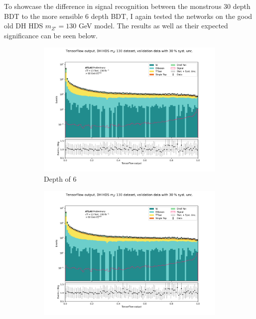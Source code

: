\documentclass[14pt, a4paper]{book}
\begin{document}
\clearpage\noindent To showcase the difference in signal recognition between the monstrous 30 depth BDT to the more sensible 6 depth BDT, I again tested the networks on the good old DH HDS $m_{Z'}=130$ GeV model.
The results as well as their expected significance can be seen below.
\begin{figure}[!ht]
	\centering
   \graphicspath{{../../../Plots/XGBoost/FULL/GRIDSEARCH_n_est_10-1000/DH_HDS_mZp_130/}}
	\begin{subfigure}[b]{0.49\textwidth}
        \centering
        \includegraphics[width=1\textwidth]{VAL.pdf}
        \caption{Depth of 6}
     \end{subfigure}
     \hfill\graphicspath{{../../../Plots/XGBoost/FULL/DH_HDS_mZp_130/}}
     \begin{subfigure}[b]{0.49\textwidth}
        \centering
        \includegraphics[width=1\textwidth]{VAL.pdf}

\end{subfigure}
\end{figure}
\end{document}

